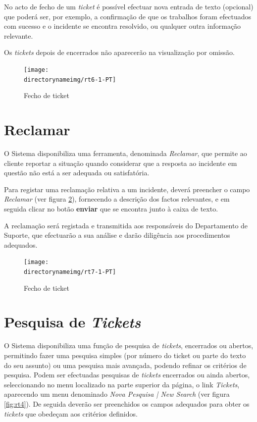 No acto de fecho de um \emph{ticket} é possível efectuar nova entrada de texto (opcional) que poderá ser, por exemplo, a confirmação de que os trabalhos foram efectuados com sucesso e o incidente se encontra resolvido, ou qualquer outra informação relevante.

Os \emph{tickets} depois de encerrados não aparecerão na visualização por omissão.

\begin{figure}[H]
\begin{center}
\texttt{[image: \\directorynameimg/rt6-1-PT]}
\end{center}
\caption{Fecho de ticket}
\label{fig:rt6}
\end{figure}

\section{Reclamar}
O Sistema disponibiliza uma ferramenta, denominada \emph{Reclamar}, que permite ao cliente reportar a situação quando considerar que a resposta ao incidente em questão não está a ser adequada ou satisfatória.

Para registar uma reclamação relativa a um incidente, deverá preencher o campo \emph{Reclamar} (ver figura \ref{fig:rt7}), fornecendo a descrição dos factos relevantes, e em seguida clicar no botão \textbf{enviar} que se encontra junto à caixa de texto.

A reclamação será registada e transmitida aos responsáveis do Departamento de Suporte, que efectuarão a sua análise e darão diligência aos procedimentos adequados.

\begin{figure}[H]
\begin{center}
\texttt{[image: \\directorynameimg/rt7-1-PT]}
\end{center}
\caption{Fecho de ticket}
\label{fig:rt7}
\end{figure}



\section{Pesquisa de \emph{Tickets}}
O Sistema disponibiliza uma função de pesquisa de \emph{tickets}, encerrados ou abertos, permitindo fazer uma pesquisa simples (por número do ticket ou parte do texto do seu assunto) ou uma pesquisa mais avançada, podendo refinar os critérios de pesquisa.
Podem ser efectuadas pesquisas de \emph{tickets} encerrados ou ainda abertos, seleccionando no menu localizado na parte superior da página, o link \emph{Tickets}, aparecendo um menu denominado \emph{Nova Pesquisa | New Search} (ver figura \ref{fig:rt4}). De seguida deverão ser preenchidos os campos adequados para obter os \emph{tickets} que obedeçam aos critérios definidos.

